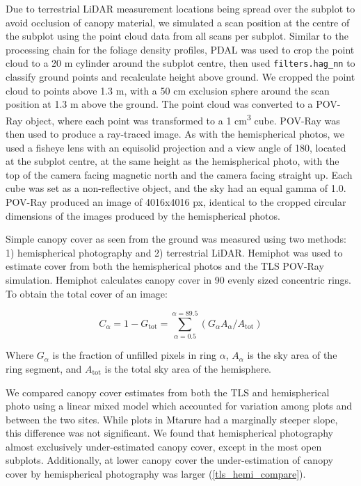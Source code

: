 \documentclass[11pt,a4paper]{article}
\begin{document}
Due to terrestrial LiDAR measurement locations being spread over the subplot to avoid occlusion of canopy material, we simulated a scan position at the centre of the subplot using the point cloud data from all scans per subplot. Similar to the processing chain for the foliage density profiles, PDAL was used to crop the point cloud to a 20 m cylinder around the subplot centre, then used \texttt{filters.hag\_nn} to classify ground points and recalculate height above ground. We cropped the point cloud to points above 1.3 m, with a 50 cm exclusion sphere around the scan position at 1.3 m above the ground. The point cloud was converted to a POV-Ray object, where each point was transformed to a 1 cm\textsuperscript{3} cube. POV-Ray was then used to produce a ray-traced image. As with the hemispherical photos, we used a fisheye lens with an equisolid projection and a view angle of 180\textdegree, located at the subplot centre, at the same height as the hemispherical photo, with the top of the camera facing magnetic north and the camera facing straight up. Each cube was set as a non-reflective object, and the sky had an equal gamma of 1.0. POV-Ray produced an image of 4016x4016 px, identical to the cropped circular dimensions of the images produced by the hemispherical photos.

Simple canopy cover as seen from the ground was measured using two methods: 1) hemispherical photography and 2) terrestrial LiDAR. Hemiphot \citep{} was used to estimate cover from both the hemispherical photos and the TLS POV-Ray simulation. Hemiphot calculates canopy cover in 90 evenly sized concentric rings. To obtain the total cover of an image:

\begin{equation}
	C_{\alpha{}} = 1 - G_{\text{tot}} = \sum_{\alpha{} = 0.5}^{\alpha{} = 89.5}(G_{\alpha{}} A_{\alpha{}} / A_{\text{tot}})
\end{equation}

Where $G_{\alpha{}}$ is the fraction of unfilled pixels in ring $\alpha{}$, $A_{\alpha{}}$ is the sky area of the ring segment, and $A_{\text{tot}}$ is the total sky area of the hemisphere.

We compared canopy cover estimates from both the TLS and hemispherical photo using a linear mixed model which accounted for variation among plots and between the two sites. While plots in Mtarure had a marginally steeper slope, this difference was not significant. We found that hemispherical photography almost exclusively under-estimated canopy cover, except in the most open subplots. Additionally, at lower canopy cover the under-estimation of canopy cover by hemispherical photography was larger (\autoref{tls_hemi_compare}).
\end{document}
